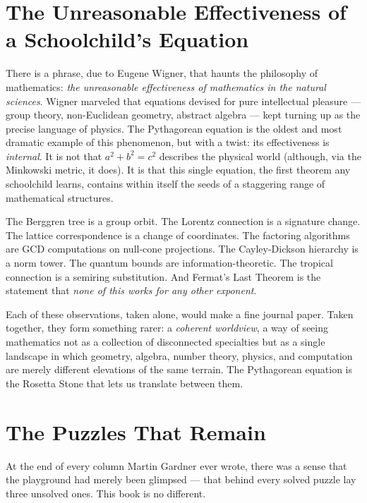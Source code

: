 \documentclass[11pt,openright,twoside]{book}
\theoremstyle{definition}
\begin{document}
\bigskip


\section{The Unreasonable Effectiveness of a Schoolchild's Equation}

There is a phrase, due to Eugene Wigner, that haunts the philosophy of mathematics: \textit{the unreasonable effectiveness of mathematics in the natural sciences}. Wigner marveled that equations devised for pure intellectual pleasure --- group theory, non-Euclidean geometry, abstract algebra --- kept turning up as the precise language of physics. The Pythagorean equation is the oldest and most dramatic example of this phenomenon, but with a twist: its effectiveness is \textit{internal}. It is not that $a^2 + b^2 = c^2$ describes the physical world (although, via the Minkowski metric, it does). It is that this single equation, the first theorem any schoolchild learns, contains within itself the seeds of a staggering range of mathematical structures.

The Berggren tree is a group orbit. The Lorentz connection is a signature change. The lattice correspondence is a change of coordinates. The factoring algorithms are GCD computations on null-cone projections. The Cayley-Dickson hierarchy is a norm tower. The quantum bounds are information-theoretic. The tropical connection is a semiring substitution. And Fermat's Last Theorem is the statement that \textit{none of this works for any other exponent}.

Each of these observations, taken alone, would make a fine journal paper. Taken together, they form something rarer: a \textit{coherent worldview}, a way of seeing mathematics not as a collection of disconnected specialties but as a single landscape in which geometry, algebra, number theory, physics, and computation are merely different elevations of the same terrain. The Pythagorean equation is the Rosetta Stone that lets us translate between them.


\bigskip


\section{The Puzzles That Remain}

At the end of every column Martin Gardner ever wrote, there was a sense that the playground had merely been glimpsed --- that behind every solved puzzle lay three unsolved ones. This book is no different.
\end{document}
